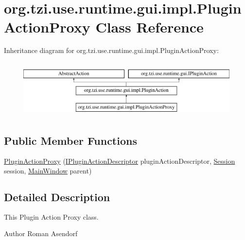 \hypertarget{classorg_1_1tzi_1_1use_1_1runtime_1_1gui_1_1impl_1_1_plugin_action_proxy}{\section{org.\-tzi.\-use.\-runtime.\-gui.\-impl.\-Plugin\-Action\-Proxy Class Reference}
\label{classorg_1_1tzi_1_1use_1_1runtime_1_1gui_1_1impl_1_1_plugin_action_proxy}
}
Inheritance diagram for org.\-tzi.\-use.\-runtime.\-gui.\-impl.\-Plugin\-Action\-Proxy\-:\begin{figure}[H]
\begin{center}
\leavevmode
\includegraphics[height=3.000000cm]{classorg_1_1tzi_1_1use_1_1runtime_1_1gui_1_1impl_1_1_plugin_action_proxy}
\end{center}
\end{figure}
\subsection*{Public Member Functions}
\begin{DoxyCompactItemize}
\item 
\hyperlink{classorg_1_1tzi_1_1use_1_1runtime_1_1gui_1_1impl_1_1_plugin_action_proxy_a3dcfa349c29c240039939d3a863ab837}{Plugin\-Action\-Proxy} (\hyperlink{interfaceorg_1_1tzi_1_1use_1_1runtime_1_1gui_1_1_i_plugin_action_descriptor}{I\-Plugin\-Action\-Descriptor} plugin\-Action\-Descriptor, \hyperlink{classorg_1_1tzi_1_1use_1_1main_1_1_session}{Session} session, \hyperlink{classorg_1_1tzi_1_1use_1_1gui_1_1main_1_1_main_window}{Main\-Window} parent)
\end{DoxyCompactItemize}


\subsection{Detailed Description}
This Plugin Action Proxy class.

\begin{DoxyAuthor}{Author}
Roman Asendorf 
\end{DoxyAuthor}


